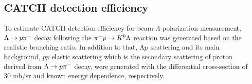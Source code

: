 \begin{comment}
\subsubsection{BGO energy measurement efficiency }
The efficiency was estimated by checking whether or not the measured energy by BGO was consistent with the predicted energy from the pp scattering kinematics, using the $pp$ elastic scattering data the same way as in the study of CFT tracking efficiency. Figure \ref{fig-BGOeff}  shows the momentum dependence of the
BGO efficiency for protons emitted at $\theta_{lab}=41^{\circ}$ where the crossed line represents the simulation result and the red circle represents the result of $pp$ elastic scattering data. Regarding BGO energy measurement efficiency, consistency between data and simulations was confirmed in all angular regions. Therefore, the simulated efficiency was used as the efficiency map, as shown in Figure \ref{fig-BGOeffmap}. For more details, refer to Ref. \cite{Miwa-SMp}.

\begin{figure}[!h]
  \begin{minipage}[t]{0.48\columnwidth}
    \centering
    \texttt{[image: BGOeff.png]}
    \caption{Momentum dependence of the BGO energy measurement for protons from the $pp$ elastic scattering data and the simulation data for a scattering angle of $\theta_{lab}=41^{\circ}$ \cite{Miwa-SMp}.}
    \label{fig-BGOeff}
  \end{minipage}
  \hspace{0.04\columnwidth} %
  \begin{minipage}[t]{0.48\columnwidth}
    \centering
    \texttt{[image: BGOeffmap.png]}
    \caption{Estimated BGO efficiency map as a function of the scattering angle and momentum of the proton \cite{Miwa-SMp}.}
    \label{fig-BGOeffmap}
  \end{minipage}
\end{figure}

\end{comment}


\subsection{CATCH detection efficiency}

To estimate CATCH detection efficiency for beam $\Lambda$ polarization measurement, $\Lambda\to p\pi^{-}$ decay following the $\pi^- p \to K^0 \Lambda$ reaction was generated based on the realistic branching ratio. In addition to that, $\Lambda p$ scattering and its main background, $pp$ elastic scattering which is the secondary scattering of proton derived from $\Lambda\to p\pi^{-}$ decay, were generated with the differential cross-section of 30 mb/sr and known energy dependence, respectively.

